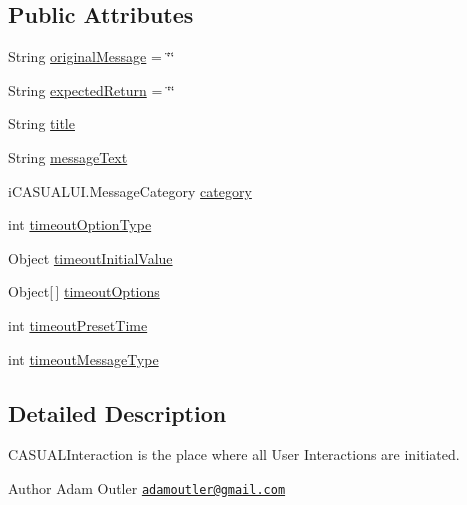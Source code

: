 \subsection*{Public Attributes}
\begin{DoxyCompactItemize}
\item 
String \hyperlink{class_c_a_s_u_a_l_1_1_c_a_s_u_a_l_message_object_a9716079f17fbab4b81420fb28be1b3d0}{original\-Message} = \char`\"{}\char`\"{}
\item 
String \hyperlink{class_c_a_s_u_a_l_1_1_c_a_s_u_a_l_message_object_a3ecbe3ab3a844982f085d4e45c3cf66f}{expected\-Return} = \char`\"{}\char`\"{}
\item 
String \hyperlink{class_c_a_s_u_a_l_1_1_c_a_s_u_a_l_message_object_aa05172adf910fdff74387ea7e8a1c03f}{title}
\item 
String \hyperlink{class_c_a_s_u_a_l_1_1_c_a_s_u_a_l_message_object_a39eaae2b27f09933cfeb9089499fede6}{message\-Text}
\item 
i\-C\-A\-S\-U\-A\-L\-U\-I.\-Message\-Category \hyperlink{class_c_a_s_u_a_l_1_1_c_a_s_u_a_l_message_object_a244858f3a903c9e188344d9eff0f1c7b}{category}
\item 
int \hyperlink{class_c_a_s_u_a_l_1_1_c_a_s_u_a_l_message_object_af046b1b60b9c4a847bddd8f0a6b112be}{timeout\-Option\-Type}
\item 
Object \hyperlink{class_c_a_s_u_a_l_1_1_c_a_s_u_a_l_message_object_aadff4442c0e9beed9b99144efb9a99f8}{timeout\-Initial\-Value}
\item 
Object\mbox{[}$\,$\mbox{]} \hyperlink{class_c_a_s_u_a_l_1_1_c_a_s_u_a_l_message_object_aba5217eefa6ca75bb6ccc24f70467d9a}{timeout\-Options}
\item 
int \hyperlink{class_c_a_s_u_a_l_1_1_c_a_s_u_a_l_message_object_a87012881239a6672883c8a08cbadb52e}{timeout\-Preset\-Time}
\item 
int \hyperlink{class_c_a_s_u_a_l_1_1_c_a_s_u_a_l_message_object_a6d7381fc02cd0fa6268f445eaf25f7cb}{timeout\-Message\-Type}
\end{DoxyCompactItemize}


\subsection{Detailed Description}
C\-A\-S\-U\-A\-L\-Interaction is the place where all User Interactions are initiated.

\begin{DoxyAuthor}{Author}
Adam Outler \href{mailto:adamoutler@gmail.com}{\tt adamoutler@gmail.\-com} 
\end{DoxyAuthor}


